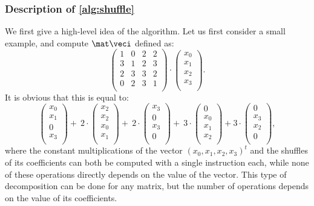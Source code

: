 \subsubsection{Description of \autoref{alg:shuffle}}
We first give a high-level idea of the algorithm.
Let us first consider a small example, and compute $\mat\veci$ defined as:
\begin{equation}
\label{matey}
	\begin{pmatrix}
	    1 & 0 & 2 & 2 \\
		3 & 1 & 2 & 3 \\
		2 & 3 & 3 & 2 \\
		0 & 2 & 3 & 1 \\
	\end{pmatrix}\cdot
	\begin{pmatrix}
	x_0 \\
	x_1 \\
	x_2 \\
	x_3 \\
	\end{pmatrix}.
\end{equation}
It is obvious that this is equal to:
\[
	\begin{pmatrix}
	x_0 \\
	x_1 \\
	0 \\
	x_3 \\
	\end{pmatrix}
	+~
	2\cdot
	\begin{pmatrix}
	x_2 \\
	x_2 \\
	x_0 \\
	x_1 \\
	\end{pmatrix}
	+~
	2\cdot
	\begin{pmatrix}
	x_3 \\
	0 \\
	x_3 \\
	0 \\
	\end{pmatrix}
	+~
	3\cdot
	\begin{pmatrix}
	0 \\
	x_0 \\
	x_1 \\
	x_2 \\
	\end{pmatrix}
	+
	3\cdot
	\begin{pmatrix}
	0 \\
	x_3 \\
	x_2 \\
	0 \\
	\end{pmatrix},
\]
where the constant multiplications of the vector $(x_0, x_1, x_2, x_3)^t$ and the shuffles of its coefficients can both be computed
with a single \pshufb{} instruction each, while none of these operations directly depends on the value of the vector.
This type of decomposition can be done for any matrix, but the number of operations depends on the value of its coefficients.


